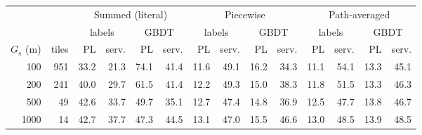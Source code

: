 \begin{tabular}{rrrrrrrrrrrrrr}
\toprule
& & \multicolumn{4}{c}{Summed (literal)} & \multicolumn{4}{c}{Piecewise} & \multicolumn{4}{c}{Path-averaged} \\
\cmidrule(lr){3-6}\cmidrule(lr){7-10}\cmidrule(lr){11-14}
& & \multicolumn{2}{c}{labels} & \multicolumn{2}{c}{GBDT} & \multicolumn{2}{c}{labels} & \multicolumn{2}{c}{GBDT} & \multicolumn{2}{c}{labels} & \multicolumn{2}{c}{GBDT} \\
\cmidrule(lr){3-4}\cmidrule(lr){5-6}\cmidrule(lr){7-8}\cmidrule(lr){9-10}\cmidrule(lr){11-12}\cmidrule(lr){13-14}
$G_s$ (m) & tiles & PL & serv. & PL & serv. & PL & serv. & PL & serv. & PL & serv. & PL & serv. \\
\midrule
100 & 951 & 33.2 & 21.3 & 74.1 & 41.4 & 11.6 & 49.1 & 16.2 & 34.3 & 11.1 & 54.1 & 13.3 & 45.1 \\
200 & 241 & 40.0 & 29.7 & 61.5 & 41.4 & 12.2 & 49.3 & 15.0 & 38.3 & 11.8 & 51.5 & 13.3 & 46.3 \\
500 & 49 & 42.6 & 33.7 & 49.7 & 35.1 & 12.7 & 47.4 & 14.8 & 36.9 & 12.5 & 47.7 & 13.8 & 46.7 \\
1000 & 14 & 42.7 & 37.7 & 47.3 & 44.5 & 13.1 & 47.0 & 15.5 & 46.6 & 13.0 & 48.5 & 13.9 & 48.5 \\
\bottomrule
\end{tabular}
